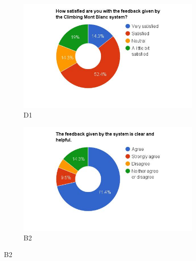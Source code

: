 \begin{figure}
    \centering
    \begin{subfigure}[h]{0.45\textwidth}
        \centerline{\includegraphics[width=1.5\textwidth]{results/feedback_cmb.jpg}}
        \caption{D1}
        \label{fig:cmb-feedback}
    \end{subfigure}
    \hfill
    \begin{subfigure}[h]{0.45\textwidth}
        \centerline{\includegraphics[width=1.5\textwidth]{results/clear_feedback_cmb.jpg}}
        \caption{B2}
        \label{fig:cmb-feedback-clear}
    \end{subfigure}


\end{figure}
